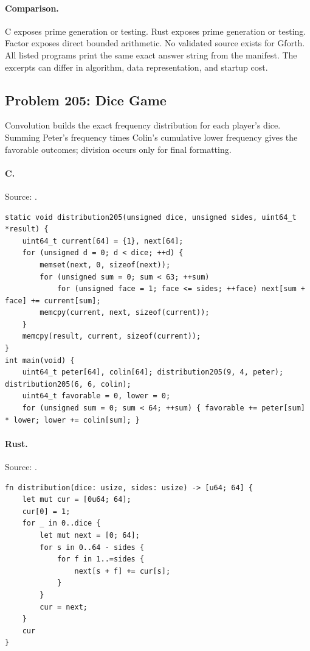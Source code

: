 \paragraph{Comparison.}
C exposes prime generation or testing. Rust exposes prime generation or testing. Factor exposes direct bounded arithmetic.
No validated source exists for Gforth.
All listed programs print the same exact answer string from the manifest. The excerpts can differ in algorithm, data representation, and startup cost.

\subsection{Problem 205: Dice Game}
\label{walkthrough:p205}
Convolution builds the exact frequency distribution for each player's dice. Summing Peter's frequency times Colin's cumulative lower frequency gives the favorable outcomes; division occurs only for final formatting.

\paragraph{C.} Source: .
\begin{lstlisting}
static void distribution205(unsigned dice, unsigned sides, uint64_t *result) {
    uint64_t current[64] = {1}, next[64];
    for (unsigned d = 0; d < dice; ++d) {
        memset(next, 0, sizeof(next));
        for (unsigned sum = 0; sum < 63; ++sum)
            for (unsigned face = 1; face <= sides; ++face) next[sum + face] += current[sum];
        memcpy(current, next, sizeof(current));
    }
    memcpy(result, current, sizeof(current));
}
int main(void) {
    uint64_t peter[64], colin[64]; distribution205(9, 4, peter); distribution205(6, 6, colin);
    uint64_t favorable = 0, lower = 0;
    for (unsigned sum = 0; sum < 64; ++sum) { favorable += peter[sum] * lower; lower += colin[sum]; }
\end{lstlisting}

\paragraph{Rust.} Source: .
\begin{lstlisting}
fn distribution(dice: usize, sides: usize) -> [u64; 64] {
    let mut cur = [0u64; 64];
    cur[0] = 1;
    for _ in 0..dice {
        let mut next = [0; 64];
        for s in 0..64 - sides {
            for f in 1..=sides {
                next[s + f] += cur[s];
            }
        }
        cur = next;
    }
    cur
}
\end{lstlisting}

